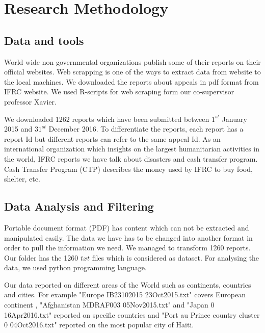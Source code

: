 \chapter{Research Methodology}
\section{Data and tools}
World wide non governmental organizations publish some of their reports on their official websites.  Web scrapping is one of the ways to extract data from website to the local machines. We downloaded the reports about appeals in pdf format from IFRC website. 
We used R-scripts for web scraping form our co-supervisor professor Xavier.
 
We downloaded 1262 reports which have been submitted between $ 1^{st}$ January 2015 and $31^{st}$ December 2016. To differentiate the reports, each report has  a report Id but different reports can refer to the same appeal Id.
As an international organization which insights
on the largest humanitarian  activities in the world,
IFRC reports we have talk about disasters and cash transfer program.
Cash Transfer Program (CTP) describes the money used by IFRC to buy food, shelter, etc.
\section{Data Analysis and Filtering}

Portable document format (PDF) has content which can not be extracted and manipulated  easily. The data we have has to be changed into another format in order to pull the information we need. We managed to transform 1260 reports.  Our folder has the 1260
$ txt $
files which is considered as dataset. For analysing the data, we used  python programming language.

Our data reported on different areas of the World such as continents, countries and cities. For example "Europe IB23102015 23Oct2015.txt" covers European continent , "Afghanistan MDRAF003 05Nov2015.txt" and  "Japan 0 16Apr2016.txt" reported  on specific countries and  "Port au Prince country cluster 0 04Oct2016.txt" reported on the most popular
city of Haiti.

